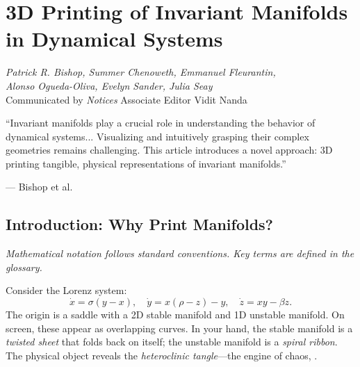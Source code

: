 \chapter{3D Printing of Invariant Manifolds in Dynamical Systems}
\label{ch:3dprint}

\begin{flushright}
\textit{Patrick R. Bishop, Summer Chenoweth, Emmanuel Fleurantin,\\ Alonso Ogueda-Oliva, Evelyn Sander, Julia Seay}\\
Communicated by \textit{Notices} Associate Editor Vidit Nanda
\end{flushright}

\epigraph{``Invariant manifolds play a crucial role in understanding the behavior of dynamical systems... Visualizing and intuitively grasping their complex geometries remains challenging. This article introduces a novel approach: 3D printing tangible, physical representations of invariant manifolds.''}{--- Bishop et al.} \cite{cabre2003parameterization}

\begin{abstract}
Stable and unstable manifolds organize the long-term behavior of dynamical systems. They are typically visualized as 2D projections of 3D objects---losing crucial geometric information. This chapter presents a complete pipeline: compute local manifolds via the Parameterization Method, extend globally via numerical integration, mesh and thicken for 3D printing, and produce physical models that reveal intersections, spirals, and folding invisible on screens, \cite{cabre2003parameterization}.
\end{abstract}

\section{Introduction: Why Print Manifolds?}

\noindent\textit{Mathematical notation follows standard conventions. Key terms are defined in the glossary.}\n
\label{sec:3dp:intro}

Consider the Lorenz system: \cite{bishop2026printing}
\[
\dot{x} = \sigma(y-x), \quad \dot{y} = x(\rho-z)-y, \quad \dot{z} = xy - \beta z.
\]
The origin is a saddle with a 2D stable manifold and 1D unstable manifold. On screen, these appear as overlapping curves. In your hand, the stable manifold is a \emph{twisted sheet} that folds back on itself; the unstable manifold is a \emph{spiral ribbon}. The physical object reveals the \emph{heteroclinic tangle}---the engine of chaos, \cite{cabre2003parameterization}.

